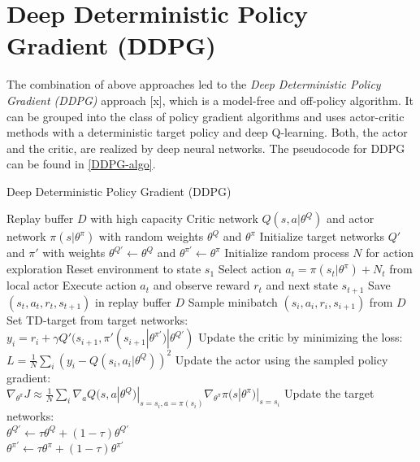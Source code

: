 \section{Deep Deterministic Policy Gradient (DDPG)}
\label{sec:DDPG}
\nocite{lillicrap2015continuous}
The combination of above approaches led to the \textit{Deep Deterministic Policy Gradient (DDPG)} approach [x], which is a model-free and off-policy algorithm. It can be grouped into the class of policy gradient algorithms and uses actor-critic methods with a deterministic target policy and deep Q-learning. Both, the actor and the critic, are realized by deep neural networks. The pseudocode for DDPG can be found in \ref{DDPG-algo}.
\begin{algorithm}
	\caption{Deep Deterministic Policy Gradient (DDPG)}\label{DDPG-algo}
	\begin{algorithmic}
		\REQUIRE Replay buffer $\mathit{D}$ with high capacity
		\REQUIRE Critic network $Q(s,a|\theta^Q)$ and actor network $\pi(s|\theta^\pi)$ with random weights $\theta^Q$ and $\theta^\pi$
		\REQUIRE Initialize target networks $Q'$ and $\pi'$ with weights $\theta^{Q'}\leftarrow\theta^Q$ and $\theta^{\pi'}\leftarrow\theta^\pi$
		\STATE Initialize random process $\mathit{N}$ for action exploration
		\STATE Reset environment to state $s_1$
		\STATE Select action $a_t = \pi(s_t|\theta^\pi) + \mathit{N}_t$ from local actor
		\STATE Execute action $a_t$ and observe reward $r_t$ and next state $s_{t+1}$
		\STATE Save $(s_t, a_t, r_t,s_{t+1})$ in replay buffer $D$
		\STATE Sample minibatch $(s_i, a_i, r_i,s_{i+1})$ from $D$
		\STATE Set TD-target from target networks:\\
		\qquad $y_i = r_i + \gamma Q'(s_{i+1}, \pi'(s_{i+1}|\theta^{\pi'})|\theta^{Q'})$
		\STATE Update the critic by minimizing the loss:\\
		\qquad $L=\frac{1}{N}\sum_i(y_i - Q(s_i,a_i|\theta^Q))^2$
		\STATE Update the actor using the sampled policy gradient:\\ 			\qquad $\nabla_{\theta^\pi}J \approx \frac{1}{N} \sum_i \nabla_a Q(s,a|\theta^Q)|_{s=s_i, a=\pi(s_i)}\nabla_{\theta^\pi}\pi(s|\theta^\pi)|_{s=s_i}$
		\STATE Update the target networks:\\
		\qquad $\theta^{Q'}\leftarrow \tau \theta^Q + (1-\tau)\theta^{Q'}$\\
		\qquad $\theta^{\pi'}\leftarrow \tau \theta^\pi + (1-\tau)\theta^{\pi'}$
		\ENDFOR
		\ENDFOR
	\end{algorithmic}
\end{algorithm}
